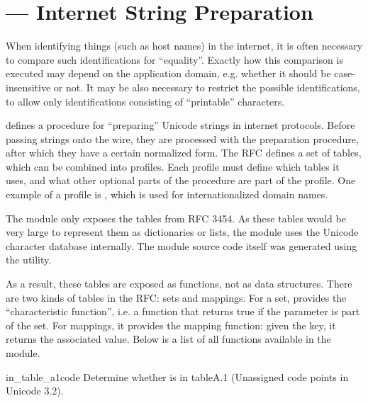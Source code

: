 \section{ ---
         Internet String Preparation}


When identifying things (such as host names) in the internet, it is
often necessary to compare such identifications for
``equality''. Exactly how this comparison is executed may depend on
the application domain, e.g. whether it should be case-insensitive or
not. It may be also necessary to restrict the possible
identifications, to allow only identifications consisting of
``printable'' characters.

 defines a procedure for ``preparing'' Unicode strings in
internet protocols. Before passing strings onto the wire, they are
processed with the preparation procedure, after which they have a
certain normalized form. The RFC defines a set of tables, which can be
combined into profiles. Each profile must define which tables it uses,
and what other optional parts of the  procedure are
part of the profile. One example of a  profile is
, which is used for internationalized domain names.

The module  only exposes the tables from RFC
3454. As these tables would be very large to represent them as
dictionaries or lists, the module uses the Unicode character database
internally. The module source code itself was generated using the
 utility.

As a result, these tables are exposed as functions, not as data
structures. There are two kinds of tables in the RFC: sets and
mappings. For a set,  provides the ``characteristic
function'', i.e. a function that returns true if the parameter is part
of the set. For mappings, it provides the mapping function: given the
key, it returns the associated value. Below is a list of all functions
available in the module.

\begin{funcdesc}{in_table_a1}{code}
Determine whether  is in table{A.1} (Unassigned code points
in Unicode 3.2).
\end{funcdesc}

